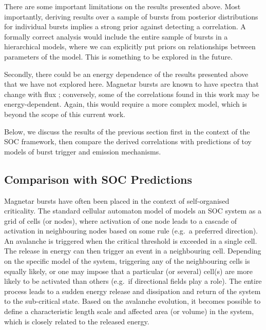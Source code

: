 \documentclass[12pt]{emulateapj}
\begin{document}
There are some important limitations on the results presented above. Most importantly, deriving results over a sample of bursts from posterior distributions for individual bursts
implies a strong prior against detecting a correlation. A formally correct analysis would include the entire sample of bursts in a hierarchical models, where we can explicitly put
priors on relationships between parameters of the model. This is something to be explored in the future.

Secondly, there could be an energy dependence of the results presented above that we have not explored here. Magnetar bursts are known to have spectra that change with flux 
\citep[e.g.][]{younes2013}; conversely, some of the correlations found in this work may be energy-dependent. Again, this would require a more complex model, which is beyond the 
scope of this current work.

Below, we discuss the results of the previous section first in the context of the SOC framework, then compare the derived correlations with predictions of toy models of burst trigger and
emission mechanisms.

\subsection{Comparison with SOC Predictions}
\label{ch6:soc}

Magnetar bursts have often been placed in the context of self-organised criticality. The standard cellular automaton model of \citet{bak1987} models an 
SOC system as a grid of cells (or nodes), where activation of one node leads to a cascade of activation in neighbouring nodes based on some rule 
(e.g.\ a preferred direction). An avalanche is triggered when the critical threshold is exceeded in a single cell. The release in energy can then trigger an event in a neighbouring cell. Depending
on the specific model of the system, triggering any of the neighbouring cells is equally likely, or one may impose that a particular (or several) cell(s) are more likely to be activated than others (e.g.\
if directional fields play a role).
The entire process leads to a sudden energy release and dissipation and return of the system to the sub-critical state.
Based on the avalanche evolution, it becomes possible to define a characteristic length scale and affected 
area (or volume) in the system, which is closely related to the released energy. 
\end{document}
